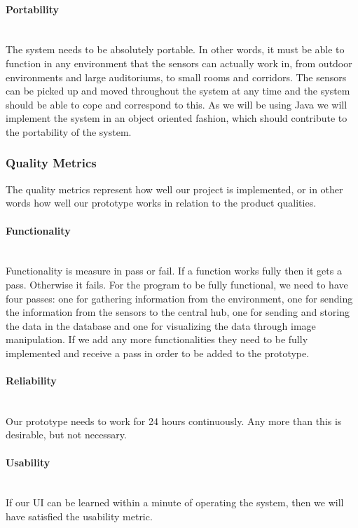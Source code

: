 \documentclass[../document.tex]{subfiles}
\begin{document}
\paragraph{Portability} \ \\
The system needs to be absolutely portable. In other words, it must be able to function in any environment that the sensors can actually work in, from outdoor environments and large auditoriums, to small rooms and corridors. The sensors can be picked up and moved throughout the system at any time and the system should be able to cope and correspond to this. As we will be using Java we will implement the system in an object oriented fashion, which should contribute to the portability of the system.

\subsubsection{Quality Metrics}
\label{subsubsec:quality_metrics}
The quality metrics represent how well our project is implemented, or in other words how well our prototype works in relation to the product qualities.

\paragraph{Functionality} \ \\
Functionality is measure in pass or fail. If a function works fully then it gets a pass. Otherwise it fails. For the program to be fully functional, we need to have four passes: one for gathering information from the environment, one for sending the information from the sensors to the central hub, one for sending and storing the data in the database and one for visualizing the data through image manipulation. If we add any more functionalities they need to be fully implemented and receive a pass in order to be added to the prototype.

\paragraph{Reliability} \ \\
Our prototype needs to work for 24 hours continuously. Any more than this is desirable, but not necessary.

\paragraph{Usability} \ \\
If our UI can be learned within a minute of operating the system, then we will have satisfied the usability metric.
\end{document}
